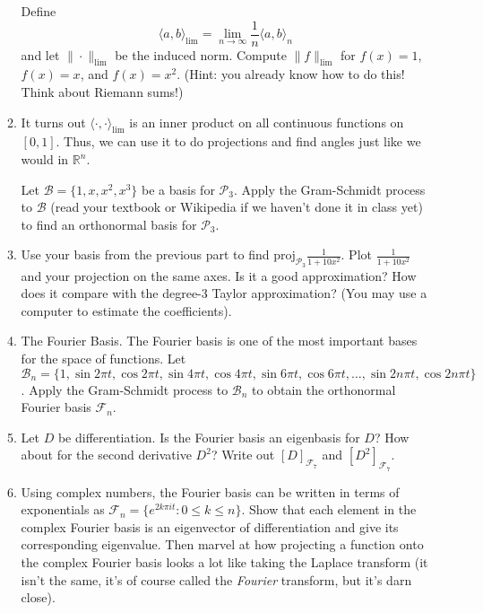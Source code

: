 \documentclass[letter]{article}
\newcommand{\R}{\mathbb{R}}
\newcommand{\proj}{\mathrm{proj}}
\begin{document}
\begin{enumerate}
\begin{enumerate}
					Define
					\[
						\langle a,b\rangle_{\lim} = \lim_{n\to\infty} \frac{1}{n}\langle a,b\rangle_n
					\]
					and let $\|\cdot\|_{\lim}$ be the induced norm.  Compute $\|f\|_{\lim}$ 
					for $f(x)=1$, $f(x)=x$, and $f(x)=x^2$.  (Hint: you already know how to do this!  Think
					about Riemann sums!)
				\item It turns out $\langle \cdot,\cdot\rangle_{\lim}$ is an inner product on all continuous
					functions on $[0,1]$.  Thus, we can use it to do projections and find angles just
					like we would in $\R^n$.  

					Let $\mathcal B=\{1,x,x^2,x^3\}$ be a basis for $\mathcal P_3$.  Apply the Gram-Schmidt process
					to $\mathcal B$ (read your textbook or Wikipedia if we haven't done it in class yet) to
					find an orthonormal basis for $\mathcal P_3$.
				\item Use your basis from the previous part to find $\proj_{\mathcal P_3} \tfrac{1}{1+10x^2}$.  Plot
					$\tfrac{1}{1+10x^2}$ and your projection on the same axes.  Is it a good approximation?  How
					does it compare with the degree-3 Taylor approximation? (You may use a computer
					to estimate the coefficients).

				\item {\sc The Fourier Basis}.  The Fourier basis is one of the most important bases for
					the space of functions.  Let $\mathcal B_n=\{1,\sin 2\pi t,\cos 2\pi t,\sin 4\pi t,\cos 4\pi t,\sin 6\pi t,\cos 6\pi t,
					\ldots, \sin 2n\pi t,\cos 2n\pi t\}$.  Apply the Gram-Schmidt process to $\mathcal B_n$
					to obtain the orthonormal Fourier basis $\mathcal F_n$.
				\item Let $D$ be differentiation.  Is the Fourier basis an eigenbasis for $D$?  How
					about for the second derivative $D^2$? Write out 
					$[D]_{\mathcal F_7}$ and $[D^2]_{\mathcal F_7}$.
				\item Using complex numbers, the Fourier basis can be written in terms of exponentials
					as $\mathcal F_n=\{ e^{2k\pi i t}: 0\leq k\leq n\}$.  Show that each element in
					the complex Fourier basis is an eigenvector of differentiation and give its
					corresponding eigenvalue.  Then marvel at how projecting a function onto the complex
					Fourier basis looks a lot like taking the Laplace transform (it isn't the same, it's
					of course called the \emph{Fourier} transform, but it's darn close).


			\end{enumerate}


		

	\end{enumerate}
\end{document}
